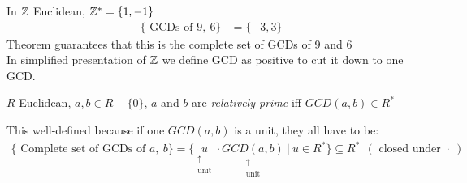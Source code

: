 \begin{example}
    In ${\mathbb{ Z}}$ Euclidean, ${\mathbb{ Z}}^*=\{1,-1\}$ 
    \begin{align*}
        \{\text{ GCDs of }9, \ 6\}&= \{-3,3\}
    \end{align*}
    Theorem guarantees that this is the complete set of GCDs of $9$ and $6$ \\ \steezybreak
    In simplified presentation of ${\mathbb{ Z}}$ we define GCD as positive to cut it down to one GCD.
\end{example}

\begin{definition}
    $R$ Euclidean, $a,b \in R-\{0\}$, $a$ and $b$ are \textit{relatively prime} iff $GCD(a,b)\in R^*$
\end{definition}
This well-defined because if one $GCD(a,b)$ is a unit, they all have to be:
\begin{align*}
    \{\text{ Complete set of GCDs of }a, \ b\}= \{\underset{\substack{\uparrow \\ \text{unit}}}{u}\cdot \underset{\substack{\uparrow \\ \text{unit}}}{GCD(a,b)} \ | \ u\in R^* \} \subseteq R^* \ \ (\text{ closed under }\cdot \ )
\end{align*}

